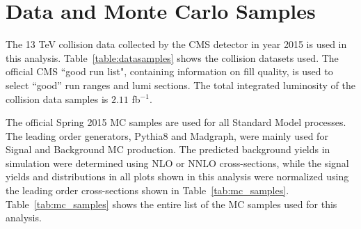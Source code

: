 \section{Data and Monte Carlo Samples}\label{sec:samples}


The 13 TeV collision data collected by the CMS detector in year 2015 is used in this analysis. Table~\ref{table:datasamples} shows the collision datasets used. 
 The official CMS ``good run list", containing information on fill quality, is used to select ``good'' run ranges and lumi sections. The total integrated luminosity of the collision data samples is $2.11$ fb$^{-1}$.

The official Spring 2015 MC samples are used for all Standard Model processes. The leading order generators, {\sc Pythia8} and {\sc Madgraph}, were 
mainly used for Signal and Background MC production. The predicted background yields in simulation were determined using NLO or NNLO cross-sections, while the 
signal yields and distributions in all plots shown in this analysis were normalized using the leading order cross-sections shown in Table~\ref{tab:mc_samples}. 
Table~\ref{tab:mc_samples} shows the entire list of the MC samples used for this analysis. 

